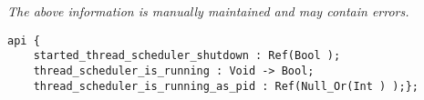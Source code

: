 \label{pkg:thread\_scheduler\_is\_running}

{\tiny \it The above information is manually maintained and may contain errors.}
\begin{verbatim}
api {
    started_thread_scheduler_shutdown : Ref(Bool );
    thread_scheduler_is_running : Void -> Bool;
    thread_scheduler_is_running_as_pid : Ref(Null_Or(Int ) );};
\end{verbatim}

